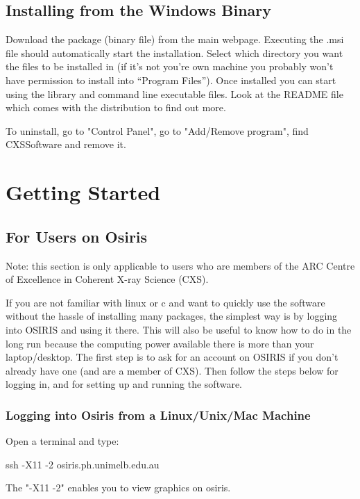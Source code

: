 \documentclass[]{cxs-software}
\begin{document}
\subsection{Installing from the Windows Binary}

Download the package (binary file) from the main webpage. Executing
the .msi file should automatically start the installation. Select
which directory you want the files to be installed in (if it's not
you're own machine you probably won't have permission to install into
``Program Files''). Once installed you can start using the library and
command line executable files. Look at the README file which comes
with the distribution to find out more. 

To uninstall, go to "Control Panel", go to "Add/Remove program", find
CXSSoftware and remove it.


\section{Getting Started}
\label{getting started}

\subsection{For Users on Osiris}

Note: this section is only applicable to users who are members of
the ARC Centre of Excellence in Coherent X-ray Science (CXS).

If you are not familiar with linux or c and want to quickly use the
software without the hassle of installing many packages, the simplest
way is by logging into OSIRIS and using it there. This will also be
useful to know how to do in the long run because the computing power
available there is more than your laptop/desktop. The first step is to
ask for an account on OSIRIS if you don't already have one (and are a
member of CXS). Then follow the steps below for logging in, and for
setting up and running the software.

\subsubsection{Logging into Osiris from a Linux/Unix/Mac Machine}

Open a terminal and type: 
\begin{myverbatim}
  ssh -X11 -2 osiris.ph.unimelb.edu.au 
\end{myverbatim}
The "-X11 -2" enables you to view graphics on osiris.
\end{document}
